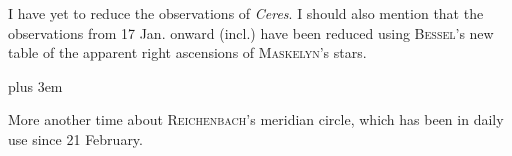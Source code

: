 \par\indent I have yet to reduce the observations of \textit{Ceres}. I should also mention that the observations from 17 Jan. onward (incl.) have been reduced using \textsc{Bessel}’s new table of the apparent right ascensions of \textsc{Maskelyn}’s stars.

{\rightskip=0pt plus 3em
\par\indent More another time about \textsc{Reichenbach}’s meridian circle, which has been in daily use since 21 February.\par}
